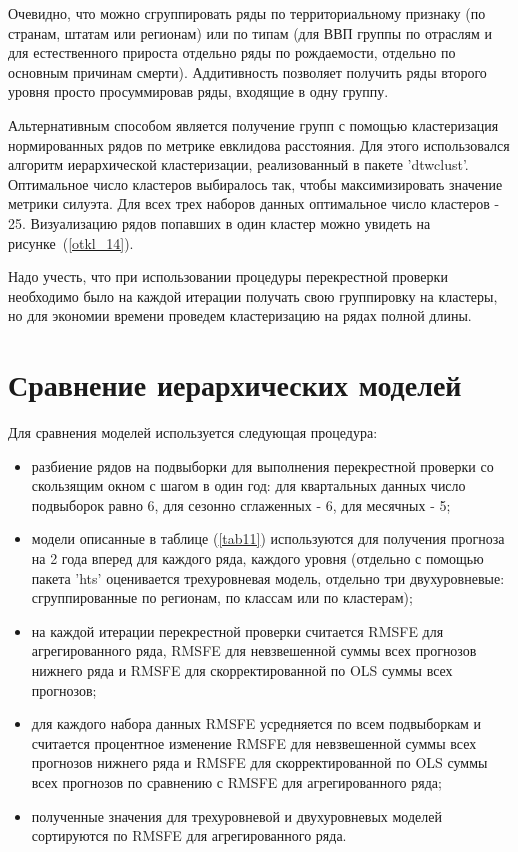 \documentclass[12pt,a4paper, oneside]{extreport}
\begin{document}
Очевидно, что можно сгруппировать ряды по территориальному признаку (по странам, штатам или регионам) или по типам (для ВВП группы по отраслям  и для естественного прироста  отдельно ряды по рождаемости, отдельно по основным причинам  смерти). Аддитивность  позволяет получить ряды второго уровня просто просуммировав ряды, входящие в одну группу. 

Альтернативным способом  является получение групп с помощью кластеризация нормированных  рядов по метрике евклидова расстояния. Для этого использовался  алгоритм иерархической кластеризации, реализованный в пакете 'dtwclust'.  
Оптимальное число кластеров выбиралось так, чтобы максимизировать значение метрики силуэта. Для всех трех наборов данных оптимальное число кластеров - 25. Визуализацию рядов попавших в один кластер можно увидеть на рисунке~(\ref{otkl_14}).

Надо учесть, что при использовании процедуры перекрестной проверки необходимо было на каждой итерации получать свою группировку на  кластеры, но для экономии времени проведем кластеризацию на рядах полной длины.






\section{Сравнение иерархических моделей}

Для сравнения моделей используется следующая процедура: 

\begin{itemize}
	\item разбиение рядов на подвыборки для выполнения перекрестной проверки со скользящим окном с шагом в один год: для квартальных данных число подвыборок равно 6, для сезонно сглаженных - 6, для месячных - 5;
	\item модели описанные в таблице (\ref{tab11}) используются для получения прогноза на 2 года вперед для каждого ряда, каждого уровня  (отдельно с помощью пакета 'hts' оценивается   трехуровневая модель,  отдельно три двухуровневые: сгруппированные по регионам, по классам или по кластерам);
	\item на каждой итерации перекрестной проверки считается RMSFE для агрегированного ряда, RMSFE для невзвешенной суммы всех прогнозов нижнего ряда и RMSFE для скорректированной по OLS суммы всех прогнозов;
	\item для каждого набора данных RMSFE усредняется по  всем подвыборкам и считается процентное изменение  RMSFE для невзвешенной суммы всех прогнозов нижнего ряда и RMSFE для скорректированной по OLS суммы всех прогнозов по сравнению с RMSFE для агрегированного ряда;
	\item полученные значения для трехуровневой и двухуровневых моделей сортируются по  RMSFE   для агрегированного ряда.
\end{itemize}
\end{document}
